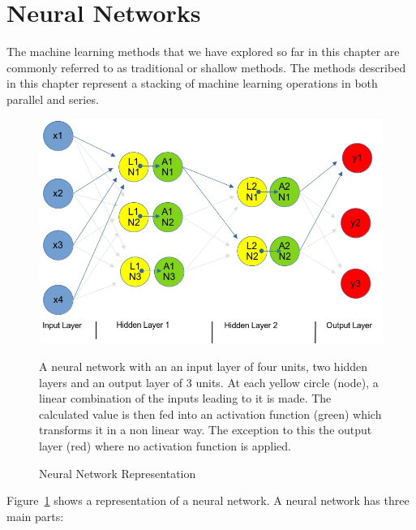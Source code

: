 \section{Neural Networks} \label{NN}

The machine learning methods that we have explored so far in this chapter are commonly referred to as traditional or shallow methods.  The methods described in this chapter represent a stacking of machine learning operations in both parallel and series.  

\begin{figure}[p]
	\centering
	\includegraphics[scale=0.5]{Figures/NeuralNetwork.jpg}
	\caption{Neural Network Representation} {A neural network with an an input layer of four units, two hidden layers and an output layer of 3 units. At each yellow circle (node), a linear combination of the inputs leading to it is made. The calculated value is then fed into an activation function (green) which transforms it in a non linear way. The exception to this the output layer (red) where no activation function is applied.}
	\label{fig:neural}
\end{figure}

\noindent
Figure~\ref{fig:neural} shows a representation of a neural network. A neural network has three main parts:

